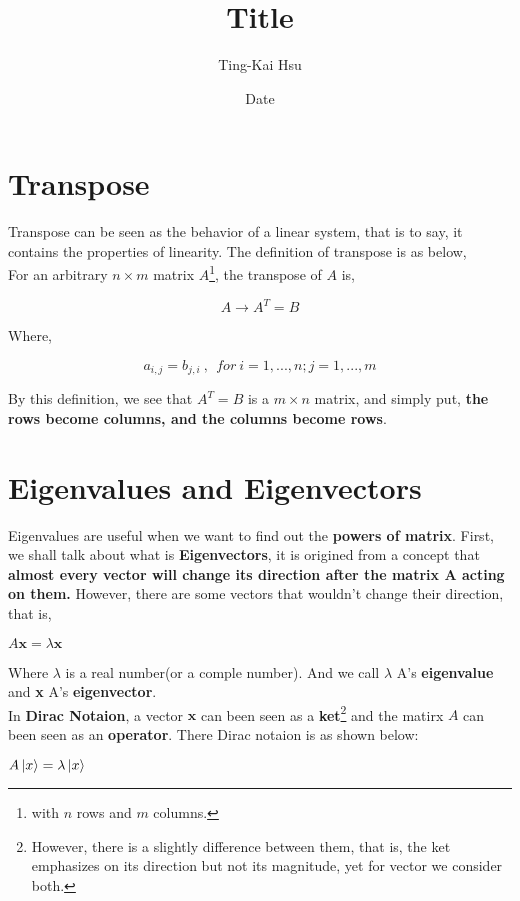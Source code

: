 \documentclass[12pt]{article}
\title{Title}
\author{Ting-Kai Hsu}
\date{Date}
\begin{document}
\section{Transpose}

Transpose can be seen as the behavior of a linear system, that is to say, it contains the properties of linearity. The definition of transpose is as below,
\\
\indent For an arbitrary $n \times m$ matrix $A$\footnote{with $n$ rows and $m$ columns.}, the transpose of $A$ is,

\begin{center}
    \[ A \longrightarrow A^T = B \]
\end{center}

Where,

\begin{center}
    \[ a_{i, j} = b_{j, i}\ ,\ \ for\ i = 1, ..., n; j = 1, ..., m \]
\end{center}

By this definition, we see that $A^T = B$ is a $m \times n$ matrix, and simply put, \textbf{the rows become columns, and the columns become rows}.

\section{Eigenvalues and Eigenvectors}

Eigenvalues are useful when we want to find out the \textbf{powers of matrix}. First, we shall talk about what is \textbf{Eigenvectors}, it is origined from a concept that \textbf{almost every vector will change its direction after the matrix A acting on them.} However, there are some vectors that wouldn't change their direction, that is,

\begin{center}
    $A\mathbf{x} = \lambda \mathbf{x}$
\end{center}

Where $\lambda$ is a real number(or a comple number).
And we call $\lambda$ A's \textbf{eigenvalue} and \textbf{x} A's \textbf{eigenvector}.
\\
In \textbf{Dirac Notaion}, a vector $\mathbf{x}$ can been seen as a \textbf{ket}\footnote{However, there is a slightly difference between them, that is, the ket emphasizes on its direction but not its magnitude, yet for vector we consider both.} and the matirx $A$ can been seen as an \textbf{operator}. There Dirac notaion is as shown below:

\begin{center}
   $A\ket*{x} = \lambda \ket*{x}$ 
\end{center}
\end{document}
